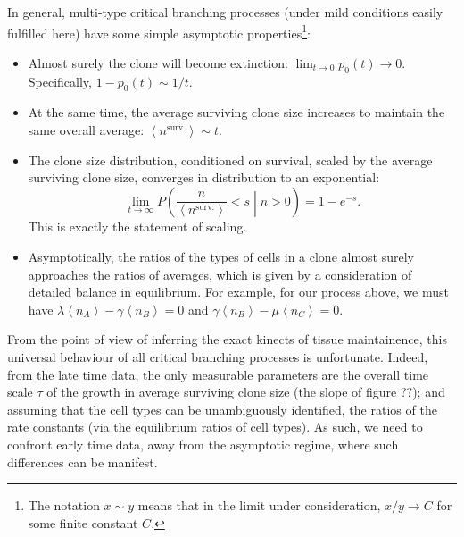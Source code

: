 \documentclass[10pt,UKenglish]{article}
\begin{document}
In general, multi-type critical branching processes (under mild conditions
easily fulfilled here) have some simple asymptotic properties\footnote{The
notation $x \sim y$ means that in the limit under consideration, $x/y
\rightarrow C$ for some finite constant $C$.}:
\begin{itemize}
	\item Almost surely the clone will become extinction: $\lim_{t
	\rightarrow 0} p_0(t) \rightarrow 0$. Specifically, $1 - p_0(t) \sim
	1/t$. 
	\item At the same time, the average surviving clone size increases to
	maintain the same overall average: $\left\langle n^\textrm{surv.}
	\right\rangle \sim t$.
	\item The clone size distribution, conditioned on survival, scaled by
	the average surviving clone size, converges in distribution to an
	exponential: $$\lim_{t \rightarrow \infty} P\left(\frac{n}{\left\langle
	n^\textrm{surv.} \right\rangle} < s \middle| n > 0 \right) = 1 -
	e^{-s}.$$ This is exactly the statement of scaling.
	\item Asymptotically, the ratios of the types of cells in a clone almost
	surely approaches the ratios of averages, which is given by a
	consideration of detailed balance in equilibrium. For example, for our
	process above, we must have $\lambda \left\langle n_A \right\rangle -
	\gamma \left\langle n_B \right\rangle = 0$ and $\gamma \left\langle n_B
	\right\rangle - \mu \left\langle n_C \right\rangle = 0$.
\end{itemize}

From the point of view of inferring the exact kinects of tissue maintainence,
this universal behaviour of all critical branching processes is unfortunate.
Indeed, from the late time data, the only measurable parameters are the overall
time scale $\tau$ of the growth in average surviving clone size (the slope of
figure ??); and assuming that the cell types can be unambiguously identified,
the ratios of the rate constants (via the equilibrium ratios of cell types). As
such, we need to confront early time data, away from the asymptotic regime,
where such differences can be manifest.

\end{document}
